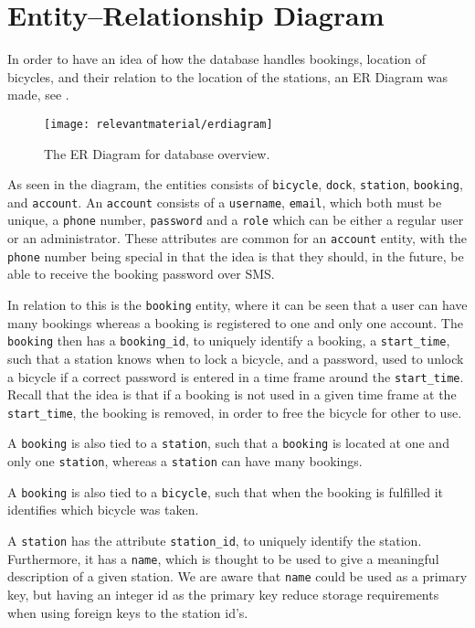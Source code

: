 \section{Entity--Relationship Diagram}\label{sec:ERdiagram}
In order to have an idea of how the database handles bookings, location of bicycles, and their relation to the location of the stations, an ER Diagram was made, see .

\begin{figure}
	\centering
	\texttt{[image: relevantmaterial/erdiagram]}
	\caption{The ER Diagram for database overview.}\label{fig:er-dia}
\end{figure}

As seen in the diagram, the entities consists of \texttt{bicycle}, \texttt{dock}, \texttt{station}, \texttt{booking}, and \texttt{account}.
An \texttt{account} consists of a \texttt{username}, \texttt{email}, which both must be unique, a \texttt{phone} number, \texttt{password} and a \texttt{role} which can be either a regular user or an administrator.
These attributes are common for an \texttt{account} entity, with the \texttt{phone} number being special in that the idea is that they should, in the future, be able to receive the booking password over SMS.

In relation to this is the \texttt{booking} entity, where it can be seen that a user can have many bookings whereas a booking is registered to one and only one account.
The \texttt{booking} then has a \texttt{booking_id}, to uniquely identify a booking, a \texttt{start_time}, such that a station knows when to lock a bicycle, and a password, used to unlock a bicycle if a correct password is entered in a time frame around the \texttt{start_time}.
Recall that the idea is that if a booking is not used in a given time frame at the \texttt{start_time}, the booking is removed, in order to free the bicycle for other to use.

A \texttt{booking} is also tied to a \texttt{station}, such that a \texttt{booking} is located at one and only one \texttt{station}, whereas a \texttt{station} can have many bookings.

A \texttt{booking} is also tied to a \texttt{bicycle}, such that when the booking is fulfilled it identifies which bicycle was taken.

A \texttt{station} has the attribute \texttt{station_id}, to uniquely identify the station.
Furthermore, it has a \texttt{name}, which is thought to be used to give a meaningful description of a given station.
We are aware that \texttt{name} could be used as a primary key, but having an integer id as the primary key reduce storage requirements when using foreign keys to the station id's.

